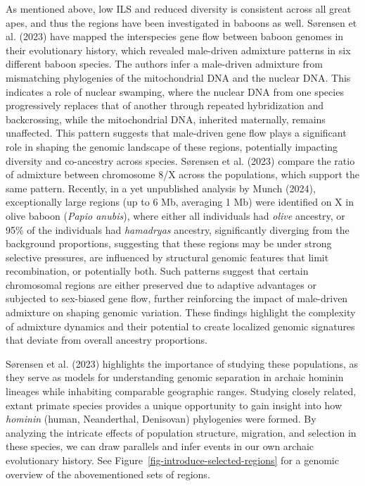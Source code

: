 \documentclass[
  11pt,
  a4paper,
]{scrbook}
\begin{document}
As mentioned above, low ILS and reduced diversity is consistent across
all great apes, and thus the regions have been investigated in baboons
as well. Sørensen et al. (2023) have mapped the interspecies gene flow
between baboon genomes in their evolutionary history, which revealed
male-driven admixture patterns in six different baboon species. The
authors infer a male-driven admixture from mismatching phylogenies of
the mitochondrial DNA and the nuclear DNA. This indicates a role of
nuclear swamping, where the nuclear DNA from one species progressively
replaces that of another through repeated hybridization and
backcrossing, while the mitochondrial DNA, inherited maternally, remains
unaffected. This pattern suggests that male-driven gene flow plays a
significant role in shaping the genomic landscape of these regions,
potentially impacting diversity and co-ancestry across species. Sørensen
et al. (2023) compare the ratio of admixture between chromosome 8/X
across the populations, which support the same pattern. Recently, in a
yet unpublished analysis by Munch (2024), exceptionally large regions
(up to 6 Mb, averaging 1 Mb) were identified on X in olive baboon
(\emph{Papio anubis}), where either all individuals had \emph{olive}
ancestry, or 95\% of the individuals had \emph{hamadryas} ancestry,
significantly diverging from the background proportions, suggesting that
these regions may be under strong selective pressures, are influenced by
structural genomic features that limit recombination, or potentially
both. Such patterns suggest that certain chromosomal regions are either
preserved due to adaptive advantages or subjected to sex-biased gene
flow, further reinforcing the impact of male-driven admixture on shaping
genomic variation. These findings highlight the complexity of admixture
dynamics and their potential to create localized genomic signatures that
deviate from overall ancestry proportions.

Sørensen et al. (2023) highlights the importance of studying these
populations, as they serve as models for understanding genomic
separation in archaic hominin lineages while inhabiting comparable
geographic ranges. Studying closely related, extant primate species
provides a unique opportunity to gain insight into how \emph{hominin}
(human, Neanderthal, Denisovan) phylogenies were formed. By analyzing
the intricate effects of population structure, migration, and selection
in these species, we can draw parallels and infer events in our own
archaic evolutionary history. See
Figure~\ref{fig-introduce-selected-regions} for a genomic overview of
the abovementioned sets of regions.
\end{document}
